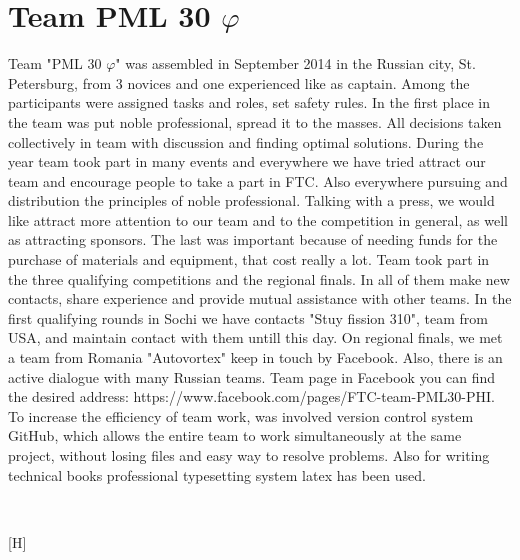 
\section{Team PML 30 ${\varphi}$} 
	Team "PML 30 ${\varphi}$" was assembled in September 2014 in  the Russian city, St. Petersburg, from 3 novices and one experienced like as captain. Among the participants were assigned tasks and roles, set safety rules. In the first place in the team was put noble professional, spread it to the masses. All decisions taken collectively in team with discussion and finding optimal solutions. 
	During the year team took part in many events and everywhere we have tried attract our team and encourage people to take a part in FTC. Also everywhere pursuing and distribution the principles of noble professional. Talking with a press, we would like attract more attention to our team and to the competition in general, as well as attracting sponsors. The last was important because of needing funds for the purchase of materials and equipment, that cost really a lot.
	Team took part in the three qualifying competitions and the regional finals. In all of them make new contacts, share experience and provide mutual assistance with other teams. In the first qualifying rounds in Sochi we have contacts "Stuy  fission 310", team from USA, and maintain contact with them untill this day. On regional finals, we met a team from Romania "Autovortex" keep in touch by Facebook. Also, there is an active dialogue with many Russian teams. Team page in Facebook you can find the desired address: https://www.facebook.com/pages/FTC-team-PML30-PHI.
	To increase the efficiency of team work, was involved version control system GitHub, which allows the entire team to work simultaneously at the same project, without losing files and easy way to resolve problems. Also for writing technical books professional typesetting system latex has been used.
	\begin{figure}[H]
		\\
	\end{figure}[H]
\fillpage

